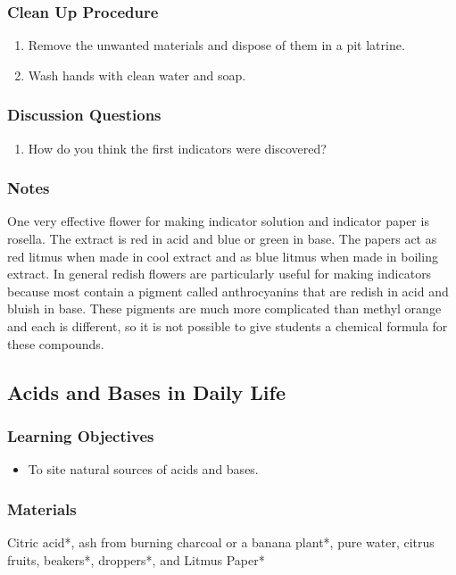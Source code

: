 \subsubsection*{Clean Up Procedure}
\begin{enumerate}
\item{Remove the unwanted materials and dispose of them in a pit latrine.}
\item{Wash hands with clean water and soap.}
\end{enumerate}

\subsubsection*{Discussion Questions}
\begin{enumerate}
\item{How do you think the first indicators were discovered?}
\end{enumerate}

\subsubsection*{Notes}
One very effective flower for making indicator solution and indicator paper is rosella. The extract is red in acid and blue or green in base. The papers act as red litmus when made in cool extract and as blue litmus when made in boiling extract. In general redish flowers are particularly useful for making indicators because most contain a pigment called anthrocyanins that are redish in acid and bluish in base. These pigments are much more complicated than methyl orange and each is different, so it is not possible to give students a chemical formula for these compounds.

\subsection{Acids and Bases in Daily Life}

\subsubsection*{Learning Objectives}
\begin{itemize}
\item{To site natural sources of acids and bases.}
\end{itemize}

\subsubsection*{Materials}
Citric acid*, ash from burning charcoal or a banana plant*, pure water, citrus fruits, beakers*, droppers*, and Litmus Paper*

